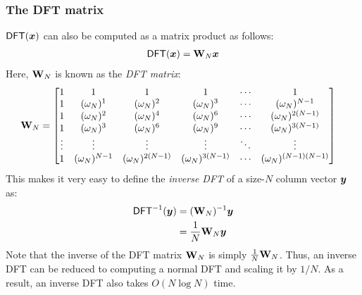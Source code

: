 \subsubsection{The DFT matrix}
\label{s:dft:matrix}
$\mathsf{DFT}(\bm{x})$ can also be computed as a matrix product as follows:
\begin{align}
    \mathsf{DFT}(\bm{x}) = \mathbf{W}_N \bm{x}
\end{align}
Here, $\mathbf{W}_N$ is known as the \textit{DFT matrix}:
\begin{align}
    \mathbf{W}_N&=
    \begin{bmatrix}
        1&1&1&1&\cdots &1\\1&(\omega_N)^1&(\omega_N)^{2}&(\omega_N)^{3}&\cdots &(\omega_N)^{N-1}\\
        1&(\omega_N)^{2}&(\omega_N)^{4}&(\omega_N)^{6}&\cdots &(\omega_N)^{2(N-1)}\\
        1&(\omega_N)^{3}&(\omega_N)^{6}&(\omega_N)^{9}&\cdots &(\omega_N)^{3(N-1)}\\
        \vdots &\vdots &\vdots &\vdots &\ddots &\vdots \\
        1&(\omega_N)^{N-1}&(\omega_N)^{2(N-1)}&(\omega_N)^{3(N-1)}&\cdots &(\omega_N)^{(N-1)(N-1)}
    \end{bmatrix}
\end{align}
This makes it very easy to define the \textit{inverse DFT} of a size-$N$ column vector $\bm{y}$ as:
\begin{align}
    \mathsf{DFT}^{-1}(\bm{y}) &= (\mathbf{W}_N)^{-1} \bm{y}\\
        &= \frac{1}{N} \mathbf{W}_N \bm{y}
\end{align}
Note that the inverse of the DFT matrix $\mathbf{W}_N$ is simply $\frac{1}{N} \mathbf{W}_N$.
Thus, an inverse DFT can be reduced to computing a normal DFT and scaling it by $1/N$.
As a result, an inverse DFT also takes $O(N\log{N})$ time.


